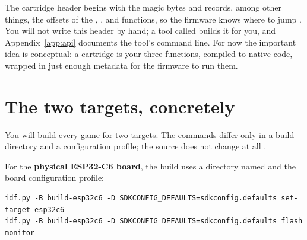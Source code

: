 \begin{center}
\label{fig:pipeline}
\end{center}

The cartridge header begins with the magic bytes  and records, among
other things, the offsets of the , , and 
functions, so the firmware knows where to jump \citep{prg32cartfmt}. You will not
write this header by hand; a tool called  builds it for you,
and Appendix~\ref{app:api} documents the tool's command line. For now the
important idea is conceptual: a cartridge is your three functions, compiled to
native code, wrapped in just enough metadata for the firmware to run them.

\section{The two targets, concretely}

You will build every game for two targets. The commands differ only in a build
directory and a configuration profile; the source does not change at all
\citep{prg32qemu}.

For the \textbf{physical ESP32\nobreakdash-C6 board}, the build uses a directory named
 and the board configuration profile:

\begin{lstlisting}[style=bash,caption={Building and flashing for the physical board (abbreviated; see Appendix~\ref{app:env}).}]
idf.py -B build-esp32c6 -D SDKCONFIG_DEFAULTS=sdkconfig.defaults set-target esp32c6
idf.py -B build-esp32c6 -D SDKCONFIG_DEFAULTS=sdkconfig.defaults flash monitor
\end{lstlisting}

